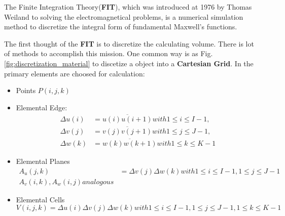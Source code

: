 
The Finite Integration Theory(\textbf{FIT}), which was introduced at 1976 by Thomas Weiland\cite{FIT_discrete_method} to solving the electromagnetical problems, is a numerical simulation method to discretize the integral form of fundamental Maxwell's functions.

The first thought of the \textbf{FIT} is to discretize the calculating volume. There is lot of methods to accomplish this mission. One common way is as Fig.\ref{fig:discretization_material} to discetize a object into a \textbf{Cartesian Grid}. In \cite{script_FeldSim} the primary elements are choosed for calculation:
\begin{itemize}
\item Points $P(i,j,k)$
\item Elemental Edge:
    \begin{align}
		\Delta u(i)&=\overline{u(i)u(i+1)} with 1\leq i \leq I-1, \nonumber\\
		\Delta v(j)&=\overline{v(j)v(j+1)} with 1\leq j \leq J-1, \nonumber\\
		\Delta w(k)&=\overline{w(k)w(k+1)} with 1\leq k \leq K-1
		\end{align}

\item Elemental Planes
		\begin{align}
			A_{u}(j,k)&=\Delta v(j)\Delta w(k) with 1\leq i \leq I-1,1\leq j \leq J-1\nonumber\\
			A_{v}(i,k),A_{w}(i,j) analogous
		\end{align}

\item Elemental Cells
		\begin{equation}
		V(i,j,k)=\Delta u(i)\Delta v(j)\Delta w(k) with 1\leq i\leq I-1,1\leq j\leq J-1,1\leq k\leq K-1
		\end{equation}

\end{itemize}



